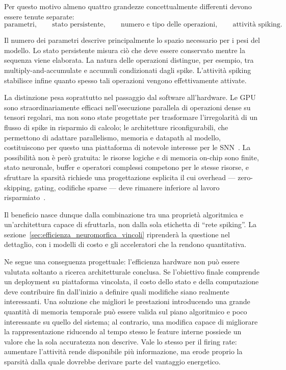 Per questo motivo almeno quattro grandezze concettualmente differenti devono essere tenute separate:
\begin{equation}
\label{eq:quattro_grandezze}
\text{parametri}, \qquad \text{stato persistente}, \qquad \text{numero e tipo delle operazioni}, \qquad \text{attività spiking}.
\end{equation}

Il numero dei parametri descrive principalmente lo spazio necessario per i pesi del modello. Lo stato persistente misura ciò che deve essere conservato mentre la sequenza viene elaborata. La natura delle operazioni distingue, per esempio, tra multiply-and-accumulate e accumuli condizionati dagli spike. L'attività spiking stabilisce infine quanto spesso tali operazioni vengono effettivamente attivate.

La distinzione pesa soprattutto nel passaggio dal software all'hardware. Le GPU sono straordinariamente efficaci nell'esecuzione parallela di operazioni dense su tensori regolari, ma non sono state progettate per trasformare l'irregolarità di un flusso di spike in risparmio di calcolo; le architetture riconfigurabili, che permettono di adattare parallelismo, memoria e datapath al modello, costituiscono per questo una piattaforma di notevole interesse per le SNN~\cite{karamimanesh2025fpga}. La possibilità non è però gratuita: le risorse logiche e di memoria on-chip sono finite, stato neuronale, buffer e operatori complessi competono per le stesse risorse, e sfruttare la sparsità richiede una progettazione esplicita il cui overhead --- zero-skipping, gating, codifiche sparse --- deve rimanere inferiore al lavoro risparmiato~\cite{karamimanesh2025fpga}.

Il beneficio nasce dunque dalla combinazione tra una proprietà algoritmica e un'architettura capace di sfruttarla, non dalla sola etichetta di ``rete spiking''. La sezione~\ref{sec:efficienza_neuromorfica_vincoli} riprenderà la questione nel dettaglio, con i modelli di costo e gli acceleratori che la rendono quantitativa.

Ne segue una conseguenza progettuale: l'efficienza hardware non può essere valutata soltanto a ricerca architetturale conclusa. Se l'obiettivo finale comprende un deployment su piattaforma vincolata, il costo dello stato e della computazione deve contribuire fin dall'inizio a definire quali modifiche siano realmente interessanti. Una soluzione che migliori le prestazioni introducendo una grande quantità di memoria temporale può essere valida sul piano algoritmico e poco interessante su quello del sistema; al contrario, una modifica capace di migliorare la rappresentazione riducendo al tempo stesso le feature interne possiede un valore che la sola accuratezza non descrive. Vale lo stesso per il firing rate: aumentare l'attività rende disponibile più informazione, ma erode proprio la sparsità dalla quale dovrebbe derivare parte del vantaggio energetico.

